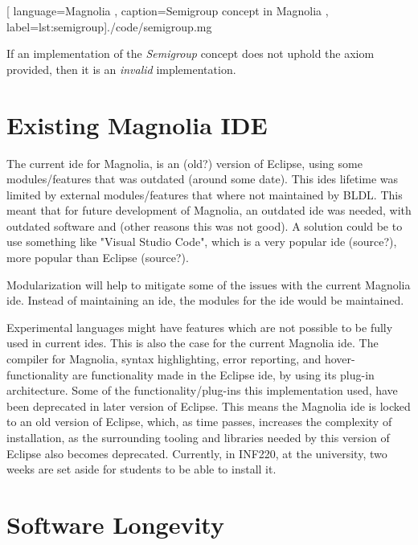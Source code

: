 \begin{center}
  
    [ language=Magnolia
    , caption={Semigroup concept in Magnolia}
    , label=lst:semigroup]{./code/semigroup.mg}
\end{center}

If an implementation of the \textit{Semigroup} concept does not uphold the axiom
provided, then it is an \textit{invalid} implementation.

\section{Existing Magnolia IDE}

The current \gls{ide} for Magnolia, is an (old?) version of Eclipse, using some
modules/features that was outdated (around some date). This \gls{ide}s lifetime was
limited by external modules/features that where not maintained by BLDL. This
meant that for future development of Magnolia, an outdated \gls{ide} was needed, with
outdated software and (other reasons this was not good). A solution could be to
use something like "Visual Studio Code", which is a very popular \gls{ide} (source?),
more popular than Eclipse (source?).

Modularization will help to mitigate some of the issues with the current
Magnolia \gls{ide}. Instead of maintaining an \gls{ide}, the modules for the
\gls{ide} would be maintained.

Experimental languages might have features which are not possible to be fully
used in current \gls{ide}s. This is also the case for the current Magnolia
\gls{ide}. The compiler for Magnolia, syntax highlighting, error reporting, and
hover-functionality are functionality made in the Eclipse \gls{ide}, by using
its plug-in architecture. Some of the functionality/plug-ins this implementation
used, have been deprecated in later version of Eclipse. This means the Magnolia
\gls{ide} is locked to an old version of Eclipse, which, as time passes,
increases the complexity of installation, as the surrounding tooling and
libraries needed by this version of Eclipse also becomes deprecated. Currently,
in INF220, at the university, two weeks are set aside for students to be able to
install it.



\section{Software Longevity}

